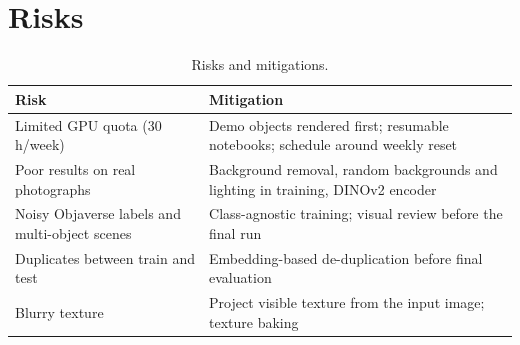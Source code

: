 \section{Risks}
\begin{table}[H]
\centering
\caption{Risks and mitigations.}
\small
\begin{tabularx}{\textwidth}{XX}
\toprule
Risk & Mitigation \\
\midrule
Limited GPU quota (30\,h/week) & Demo objects rendered first; resumable notebooks; schedule around weekly reset \\
Poor results on real photographs & Background removal, random backgrounds and lighting in training, DINOv2 encoder \\
Noisy Objaverse labels and multi-object scenes & Class-agnostic training; visual review before the final run \\
Duplicates between train and test & Embedding-based de-duplication before final evaluation \\
Blurry texture & Project visible texture from the input image; texture baking \\
\bottomrule
\end{tabularx}
\end{table}
